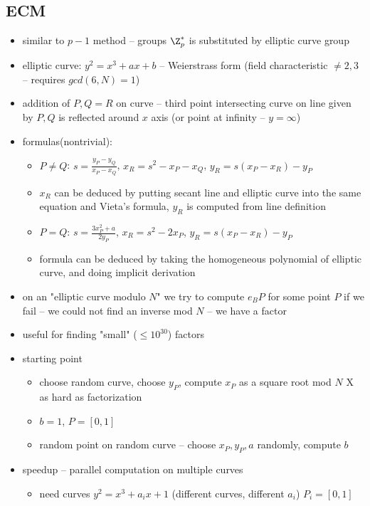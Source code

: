 \subsection*{ECM}
\begin{itemize}
	\item similar to $p-1$ method -- groups $\Z^*_p$ is substituted by elliptic curve group
	\item elliptic curve: $y^2 = x^3 + ax +b$ -- Weierstrass form (field characteristic $\neq 2,3$ -- requires $gcd(6, N) = 1$)
	\item addition of $P,Q = R$ on curve -- third point intersecting curve on line given by $P,Q$ is reflected around $x$ axis (or point at infinity -- $y = \infty$)
	\item formulas(nontrivial):
	\begin{itemize}
		\item $P \neq Q$: $s = \frac{y_P-y_Q}{x_P-x_Q}$, $x_R = s^2-x_P-x_Q$, $y_R = s(x_P-x_R)-y_P$
		\item $x_R$ can be deduced by putting secant line and elliptic curve into the same equation and Vieta's formula, $y_R$ is computed from line definition 
		\item $P = Q$: $s = \frac{3x_P^2+a}{2y_P}$, $x_R = s^2-2x_P$, $y_R = s(x_P-x_R)-y_P$
		\item formula can be deduced by taking the homogeneous polynomial of elliptic curve, and doing implicit derivation
	\end{itemize}
	\item on an "elliptic curve modulo $N$" we try to compute $e_B P$ for some point $P$ if we fail -- we could not find an inverse mod $N$ -- we have a factor
	\item useful for finding "small" ($ \leq 10^{30} $) factors
	\item starting point 
	\begin{itemize}
		\item choose random curve, choose $y_P$, compute $x_P$ as a square root mod $N$ X as hard as factorization
		\item $b = 1$, $P = [0,1]$
		\item random point on random curve -- choose $x_P,y_P,a$ randomly, compute $b$
	\end{itemize}
	\item speedup -- parallel computation on multiple curves
	\begin{itemize}
		\item need curves $y^2 = x^3+a_ix+1$ (different curves, different $a_i$) $P_i=[0,1]$

\end{itemize}
\end{itemize}
